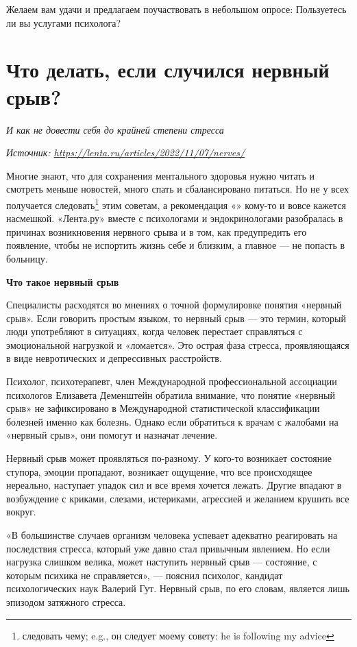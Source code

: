Желаем вам удачи и предлагаем поучаствовать в небольшом опросе: Пользуетесь ли вы услугами психолога?

\newpage
\section{Что делать, если случился нервный срыв?}

\textit{И как не довести себя до крайней степени стресса}

\textit{Источник: \url{https://lenta.ru/articles/2022/11/07/nerves/}}

Многие знают, что для сохранения ментального здоровья нужно читать и смотреть меньше новостей, много спать и сбалансировано питаться. Но не у всех получается следовать\footnote{следовать чему; e.g., он следует моему совету: he is following my advice} этим советам, а рекомендация «» кому-то и вовсе кажется насмешкой. «Лента.ру» вместе с психологами и эндокринологами разобралась в причинах возникновения нервного срыва и в том, как предупредить его появление, чтобы не испортить жизнь себе и близким, а главное — не попасть в больницу.

\textbf{Что такое нервный срыв}

Специалисты расходятся во мнениях о точной формулировке понятия «нервный срыв». Если говорить простым языком, то нервный срыв — это термин, который люди употребляют в ситуациях, когда человек перестает справляться с эмоциональной нагрузкой и «ломается». Это острая фаза стресса, проявляющаяся в виде невротических и депрессивных расстройств.

Психолог, психотерапевт, член Международной профессиональной ассоциации психологов Елизавета Деменштейн обратила внимание, что понятие «нервный срыв» не зафиксировано в Международной статистической классификации болезней именно как болезнь. Однако если обратиться к врачам с жалобами на «нервный срыв», они помогут и назначат лечение.

Нервный срыв может проявляться по-разному. У кого-то возникает состояние ступора, эмоции пропадают, возникает ощущение, что все происходящее нереально, наступает упадок сил и все время хочется лежать. Другие впадают в возбуждение с криками, слезами, истериками, агрессией и желанием крушить все вокруг.

«В большинстве случаев организм человека успевает адекватно реагировать на последствия стресса, который уже давно стал привычным явлением. Но если нагрузка слишком велика, может наступить нервный срыв — состояние, с которым психика не справляется», — пояснил психолог, кандидат психологических наук Валерий Гут. Нервный срыв, по его словам, является лишь эпизодом затяжного стресса.

